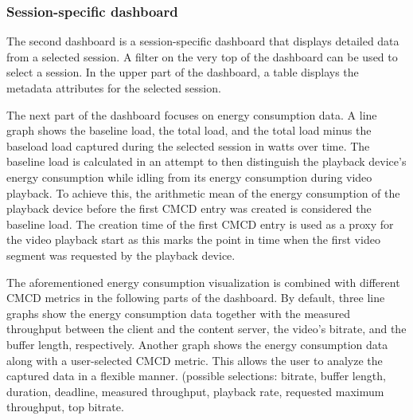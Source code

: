\subsubsection{Session-specific dashboard}
The second dashboard is a session-specific dashboard that displays detailed data from a selected session. A filter on the very top of the dashboard can be used to select a session. In the upper part of the dashboard, a table displays the metadata attributes for the selected session.

The next part of the dashboard focuses on energy consumption data. A line graph shows the baseline load, the total load, and the total load minus the baseload load captured during the selected session in watts over time. The baseline load is calculated in an attempt to then distinguish the playback device’s energy consumption while idling from its energy consumption during video playback. To achieve this, the arithmetic mean of the energy consumption of the playback device before the first CMCD entry was created is considered the baseline load. The creation time of the first CMCD entry is used as a proxy for the video playback start as this marks the point in time when the first video segment was requested by the playback device.

The aforementioned energy consumption visualization is combined with different CMCD metrics in the following parts of the dashboard. By default, three line graphs show the energy consumption data together with the measured throughput between the client and the content server, the video’s bitrate, and the buffer length, respectively. Another graph shows the energy consumption data along with a user-selected CMCD metric. This allows the user to analyze the captured data in a flexible manner. (possible selections: bitrate, buffer length, duration, deadline, measured throughput, playback rate, requested maximum throughput, top bitrate.

